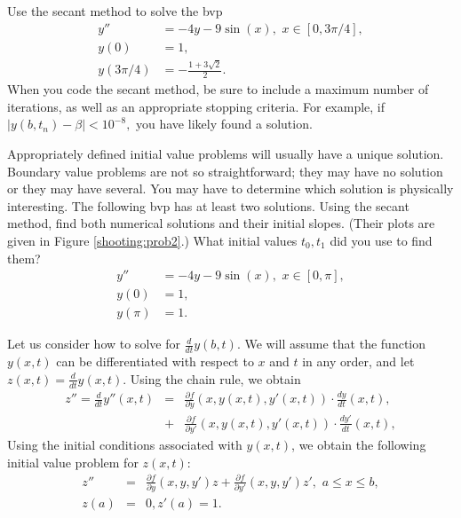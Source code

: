 \begin{problem} Use the secant method to solve the bvp
\begin{equation*}
\begin{split}
y'' &= -4y -9\sin(x), \,\, x \in [0,3\pi/4],\\
y(0) &= 1, \\
y(3\pi/4) &=-\frac{1+3\sqrt{2}}{2}.
\end{split}
\end{equation*}
When you code the secant method, be sure to include a maximum number of iterations, as well as an appropriate stopping criteria. For example, if $|y(b,t_n)-\beta|<10^{-8},$ you have likely found a solution. 
\end{problem}


\begin{problem} Appropriately defined initial value problems will usually have a unique solution. Boundary value problems are not so straightforward; they may have no solution or they may have several. You may have to determine which solution is physically interesting. The following bvp has at least two solutions. Using the secant method, find both numerical solutions and their initial slopes. (Their plots are given in Figure \eqref{shooting:prob2}.) What initial values $t_0, t_1$ did you use to find them?
\begin{equation*}
\begin{split}
y'' &= -4y -9\sin(x), \,\, x \in [0,\pi],\\
y(0) &= 1, \\
y(\pi) &=1.
\end{split}
\end{equation*}

\end{problem}


Let us consider how to solve for $\frac{d}{dt} y(b,t)$. We will assume that the function $y(x,t)$ can be differentiated with respect to $x$ and $t$ in any order, and let  $z(x,t) = \frac{d}{dt} y(x,t).$ Using the chain rule, we obtain 
\begin{eqnarray*}
z'' = \frac{d}{dt} y''(x,t) &=& \frac{\partial f}{\partial y} (x,y(x,t),y'(x,t)) \cdot \frac{dy}{dt}(x,t) ,\\
&+& \frac{\partial f}{\partial y'} (x,y(x,t),y'(x,t)) \cdot \frac{dy'}{dt}(x,t),
\end{eqnarray*}
Using the initial conditions associated with $y(x,t)$, we obtain the following initial value problem for $z(x,t)$: 
\begin{eqnarray*}
z'' &=& \frac{\partial f}{\partial y} (x,y,y') z + \frac{\partial f}{\partial y'} (x,y,y') z'
,\,\,a \leq x \leq b, \\
 z(a) &=& 0, z'(a) = 1.
\end{eqnarray*}

